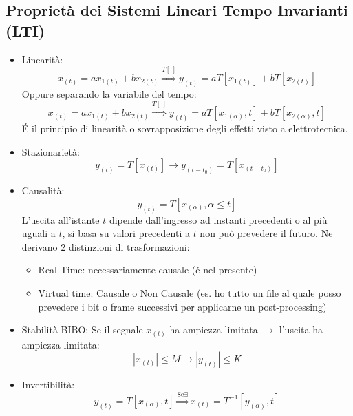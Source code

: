     \subsection{Proprietà dei Sistemi Lineari Tempo Invarianti (LTI)}
        \begin{itemize}
            \item {Linearità:
                \[
                    x_{(t)} = ax_{1(t)}+bx_{2(t)} \overset{T[\ ]}{\Rightarrow} y_{(t)} = aT[x_{1(t)}]+b T[x_{2(t)}]
                \]
                Oppure separando la variabile del tempo:
                \[
                    x_{(t)} = ax_{1(t)}+bx_{2(t)} \overset{T[\ ]}{\Rightarrow} y_{(t)} = aT[x_{1(\alpha)},t]+b T[x_{2(\alpha)},t]
                \]
                É il principio di linearità o sovrapposizione degli effetti visto a elettrotecnica.
            }\label{SM Linearita}
            \item {Stazionarietà:
                \[
                    y_{(t)} = T[x_{(t)}] \rightarrow y_{(t-t_0)} = T[x_{(t-t_0)}]  
                \]
            }\label{SM Stazionarieta}
            \item {Causalità:
                \[
                    y_{(t)} = T[x_{(\alpha)},\alpha\leq t]
                \]
                L'uscita all'istante $t$ dipende dall'ingresso ad instanti precedenti o al più uguali a $t$, si basa su valori precedenti a 
                $t$ non può prevedere il futuro. Ne derivano 2 distinzioni di trasformazioni:
                \begin{itemize}
                    \item Real Time: necessariamente causale (é nel presente)
                    \item Virtual time: Causale o Non Causale (es. ho tutto un file al quale posso prevedere i bit o frame successivi per applicarne un post-processing)
                \end{itemize}
            }\label{SM Causalita}
            \item {Stabilità BIBO:
                Se il segnale $x_{(t)}$ ha ampiezza limitata $\rightarrow$ l'uscita ha ampiezza limitata:
                    \[
                        |x_{(t)}|\leq M \rightarrow |y_{(t)}|\leq K 
                    \]
            }\label{SM Stabilita BIBO}
            \item {Invertibilità:
                \[
                    y_{(t)} = T[x_{(\alpha)},t] \overset{\text{Se} \exists}{\Rightarrow} x_{(t)} = T^{-1}[y_{(\alpha)},t]
                \]
            }\label{SM Invertibilita}

\end{itemize}
